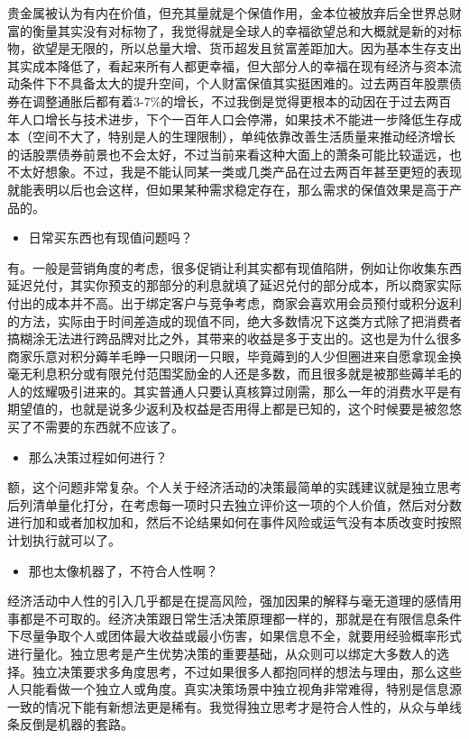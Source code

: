 \documentclass[
  letterpaper,
  DIV=11,
  numbers=noendperiod]{scrreprt}
\providecommand{\tightlist}{%
  \setlength{\itemsep}{0pt}\setlength{\parskip}{0pt}}\usepackage{longtable,booktabs,array}
\begin{document}
贵金属被认为有内在价值，但充其量就是个保值作用，金本位被放弃后全世界总财富的衡量其实没有对标物了，我觉得就是全球人的幸福欲望总和大概就是新的对标物，欲望是无限的，所以总量大增、货币超发且贫富差距加大。因为基本生存支出其实成本降低了，看起来所有人都更幸福，但大部分人的幸福在现有经济与资本流动条件下不具备太大的提升空间，个人财富保值其实挺困难的。过去两百年股票债券在调整通胀后都有着3-7\%的增长，不过我倒是觉得更根本的动因在于过去两百年人口增长与技术进步，下个一百年人口会停滞，如果技术不能进一步降低生存成本（空间不大了，特别是人的生理限制），单纯依靠改善生活质量来推动经济增长的话股票债券前景也不会太好，不过当前来看这种大面上的萧条可能比较遥远，也不太好想象。不过，我是不能认同某一类或几类产品在过去两百年甚至更短的表现就能表明以后也会这样，但如果某种需求稳定存在，那么需求的保值效果是高于产品的。

\begin{itemize}
\tightlist
\item
  日常买东西也有现值问题吗？
\end{itemize}

有。一般是营销角度的考虑，很多促销让利其实都有现值陷阱，例如让你收集东西延迟兑付，其实你预支的那部分的利息就填了延迟兑付的部分成本，所以商家实际付出的成本并不高。出于绑定客户与竞争考虑，商家会喜欢用会员预付或积分返利的方法，实际由于时间差造成的现值不同，绝大多数情况下这类方式除了把消费者搞糊涂无法进行跨品牌对比之外，其带来的收益是多于支出的。这也是为什么很多商家乐意对积分薅羊毛睁一只眼闭一只眼，毕竟薅到的人少但圈进来自愿拿现金换毫无利息积分或有限兑付范围奖励金的人还是多数，而且很多就是被那些薅羊毛的人的炫耀吸引进来的。其实普通人只要认真核算过刚需，那么一年的消费水平是有期望值的，也就是说多少返利及权益是否用得上都是已知的，这个时候要是被忽悠买了不需要的东西就不应该了。

\begin{itemize}
\tightlist
\item
  那么决策过程如何进行？
\end{itemize}

额，这个问题非常复杂。个人关于经济活动的决策最简单的实践建议就是独立思考后列清单量化打分，在考虑每一项时只去独立评价这一项的个人价值，然后对分数进行加和或者加权加和，然后不论结果如何在事件风险或运气没有本质改变时按照计划执行就可以了。

\begin{itemize}
\tightlist
\item
  那也太像机器了，不符合人性啊？
\end{itemize}

经济活动中人性的引入几乎都是在提高风险，强加因果的解释与毫无道理的感情用事都是不可取的。经济决策跟日常生活决策原理都一样的，那就是在有限信息条件下尽量争取个人或团体最大收益或最小伤害，如果信息不全，就要用经验概率形式进行量化。独立思考是产生优势决策的重要基础，从众则可以绑定大多数人的选择。独立决策要求多角度思考，不过如果很多人都抱同样的想法与理由，那么这些人只能看做一个独立人或角度。真实决策场景中独立视角非常难得，特别是信息源一致的情况下能有新想法更是稀有。我觉得独立思考才是符合人性的，从众与单线条反倒是机器的套路。
\end{document}
